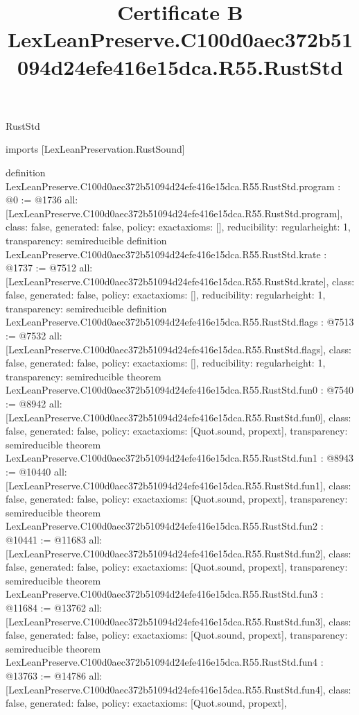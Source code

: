 \begin{lexlean}{RustStd}
\title{Certificate B LexLeanPreserve.C100d0aec372b51094d24efe416e15dca.R55.RustStd}
\begin{coremodule}
imports [LexLeanPreservation.RustSound]

definition LexLeanPreserve.C100d0aec372b51094d24efe416e15dca.R55.RustStd.program : @0 := @1736 {
  all: [LexLeanPreserve.C100d0aec372b51094d24efe416e15dca.R55.RustStd.program],
  class: false,
  generated: false,
  policy: exact{axioms: []},
  reducibility: regular{height: 1},
  transparency: semireducible
}
definition LexLeanPreserve.C100d0aec372b51094d24efe416e15dca.R55.RustStd.krate : @1737 := @7512 {
  all: [LexLeanPreserve.C100d0aec372b51094d24efe416e15dca.R55.RustStd.krate],
  class: false,
  generated: false,
  policy: exact{axioms: []},
  reducibility: regular{height: 1},
  transparency: semireducible
}
definition LexLeanPreserve.C100d0aec372b51094d24efe416e15dca.R55.RustStd.flags : @7513 := @7532 {
  all: [LexLeanPreserve.C100d0aec372b51094d24efe416e15dca.R55.RustStd.flags],
  class: false,
  generated: false,
  policy: exact{axioms: []},
  reducibility: regular{height: 1},
  transparency: semireducible
}
theorem LexLeanPreserve.C100d0aec372b51094d24efe416e15dca.R55.RustStd.fun0 : @7540 := @8942 {
  all: [LexLeanPreserve.C100d0aec372b51094d24efe416e15dca.R55.RustStd.fun0],
  class: false,
  generated: false,
  policy: exact{axioms: [Quot.sound, propext]},
  transparency: semireducible
}
theorem LexLeanPreserve.C100d0aec372b51094d24efe416e15dca.R55.RustStd.fun1 : @8943 := @10440 {
  all: [LexLeanPreserve.C100d0aec372b51094d24efe416e15dca.R55.RustStd.fun1],
  class: false,
  generated: false,
  policy: exact{axioms: [Quot.sound, propext]},
  transparency: semireducible
}
theorem LexLeanPreserve.C100d0aec372b51094d24efe416e15dca.R55.RustStd.fun2 : @10441 := @11683 {
  all: [LexLeanPreserve.C100d0aec372b51094d24efe416e15dca.R55.RustStd.fun2],
  class: false,
  generated: false,
  policy: exact{axioms: [Quot.sound, propext]},
  transparency: semireducible
}
theorem LexLeanPreserve.C100d0aec372b51094d24efe416e15dca.R55.RustStd.fun3 : @11684 := @13762 {
  all: [LexLeanPreserve.C100d0aec372b51094d24efe416e15dca.R55.RustStd.fun3],
  class: false,
  generated: false,
  policy: exact{axioms: [Quot.sound, propext]},
  transparency: semireducible
}
theorem LexLeanPreserve.C100d0aec372b51094d24efe416e15dca.R55.RustStd.fun4 : @13763 := @14786 {
  all: [LexLeanPreserve.C100d0aec372b51094d24efe416e15dca.R55.RustStd.fun4],
  class: false,
  generated: false,
  policy: exact{axioms: [Quot.sound, propext]},
}
\end{coremodule}
\end{lexlean}
